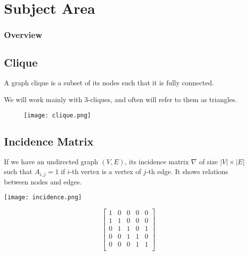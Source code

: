 \section{Subject Area}

\begin{frame}
   \frametitle{Overview}
   \tableofcontents[currentsection]
\end{frame}

\subsection{Clique}
\begin{frame}{\subsecname}
   A graph clique is a subset of its nodes such that it is fully connected.

   We will work mainly with 3-cliques, and often will refer to them as triangles.

   \begin{figure}[H]
       \centering
       \texttt{[image: clique.png]}
   \end{figure}
\end{frame}

\subsection{Incidence Matrix}
\begin{frame}{\subsecname}
   If we have an undirected graph $(V, E)$, its incidence matrix $\nabla$ of size $\lvert V \rvert \times \lvert E \rvert$ such that $A_{i, j} = 1$ if $i$-th vertex is a vertex of $j$-th edge.
   It shows relations between nodes and edges.

   \begin{multicols}{2}
       \texttt{[image: incidence.png]}

       \[
           \begin{bmatrix}
               1 & 0 & 0 & 0 & 0 \\
               1 & 1 & 0 & 0 & 0 \\
               0 & 1 & 1 & 0 & 1 \\
               0 & 0 & 1 & 1 & 0 \\
               0 & 0 & 0 & 1 & 1 \\
           \end{bmatrix}
       \]

   \end{multicols}
\end{frame}

